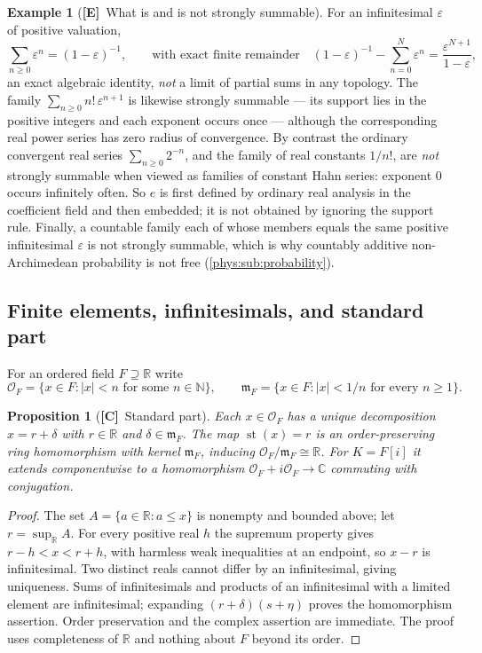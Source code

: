\documentclass[11pt,letterpaper]{article}
\numberwithin{equation}{section}
\newtheorem{proposition}[theorem]{Proposition}
\theoremstyle{definition}
\newtheorem{example}[theorem]{Example}
\theoremstyle{remark}
\newcommand{\R}{\mathbb R}
\newcommand{\C}{\mathbb C}
\newcommand{\N}{\mathbb N}
\newcommand{\eps}{\varepsilon}
\newcommand{\Ofin}{\mathcal O}
\newcommand{\mm}{\mathfrak m}
\DeclareMathOperator{\st}{st}
\newcommand{\abs}[1]{\lvert#1\rvert}
\newcommand{\TE}{\textcolor{TierE}{\textsf{\bfseries[E]}}}
\newcommand{\TC}{\textcolor{TierC}{\textsf{\bfseries[C]}}}
\begin{document}
\begin{example}[\TE\ What is and is not strongly summable]
\label{phys:ex:summable}
For an infinitesimal $\eps$ of positive valuation,
\begin{equation}\label{phys:eq:geom}
\sum_{n\ge0}\eps^{n}=(1-\eps)^{-1},
\qquad\text{with exact finite remainder}\quad
(1-\eps)^{-1}-\sum_{n=0}^{N}\eps^{n}=\frac{\eps^{N+1}}{1-\eps},
\end{equation}
an exact algebraic identity, \emph{not} a limit of partial sums in any
topology. The family $\sum_{n\ge0}n!\,\eps^{n+1}$ is likewise strongly summable
--- its support lies in the positive integers and each exponent occurs once ---
although the corresponding real power series has zero radius of convergence.
By contrast the ordinary convergent real series $\sum_{n\ge0}2^{-n}$, and the
family of real constants $1/n!$, are \emph{not} strongly summable when viewed
as families of constant Hahn series: exponent $0$ occurs infinitely often. So
$e$ is first defined by ordinary real analysis in the coefficient field and
then embedded; it is not obtained by ignoring the support rule. Finally, a
countable family each of whose members equals the same positive infinitesimal
$\eps$ is not strongly summable, which is why countably additive
non-Archimedean probability is not free (\cref{phys:sub:probability}).
\end{example}

\subsection{Finite elements, infinitesimals, and standard part}
\label{phys:sub:st}

For an ordered field $F\supseteq\R$ write
\[
\Ofin_{F}=\{x\in F:\abs x<n\text{ for some }n\in\N\},\qquad
\mm_{F}=\{x\in F:\abs x<1/n\text{ for every }n\ge1\}.
\]

\begin{proposition}[\TC\ Standard part]
\label{phys:prop:st}
Each $x\in\Ofin_{F}$ has a unique decomposition $x=r+\delta$ with $r\in\R$ and
$\delta\in\mm_{F}$. The map $\st(x)=r$ is an order-preserving ring
homomorphism with kernel $\mm_{F}$, inducing $\Ofin_{F}/\mm_{F}\cong\R$. For
$K=F[i]$ it extends componentwise to a homomorphism
$\Ofin_{F}+i\Ofin_{F}\to\C$ commuting with conjugation.
\end{proposition}
\begin{proof}
The set $A=\{a\in\R:a\le x\}$ is nonempty and bounded above; let
$r=\sup_{\R}A$. For every positive real $h$ the supremum property gives
$r-h<x<r+h$, with harmless weak inequalities at an endpoint, so $x-r$ is
infinitesimal. Two distinct reals cannot differ by an infinitesimal, giving
uniqueness. Sums of infinitesimals and products of an infinitesimal with a
limited element are infinitesimal; expanding $(r+\delta)(s+\eta)$ proves the
homomorphism assertion. Order preservation and the complex assertion are
immediate. The proof uses completeness of $\R$ and nothing about $F$ beyond
its order.
\end{proof}
\end{document}
